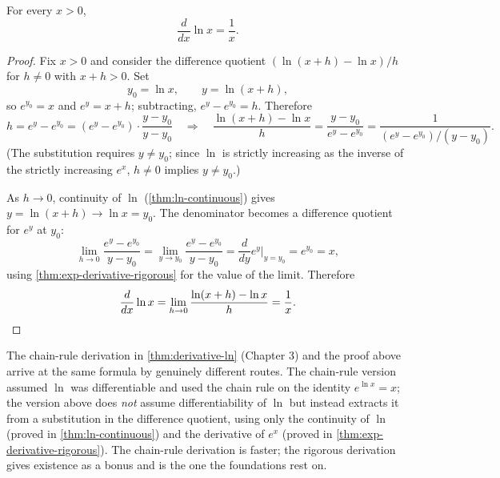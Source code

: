 \begin{theorem}\label{thm:ln-derivative-rigorous}
For every \(x > 0\),
\[
\frac{d}{dx} \ln x = \frac{1}{x}.
\]
\end{theorem}

\begin{proof}
Fix \(x > 0\) and consider the difference quotient \((\ln(x + h) - \ln x)/h\) for \(h \neq 0\) with \(x + h > 0\). Set
\[
y_{0} = \ln x, \qquad y = \ln(x + h),
\]
so \(e^{y_{0}} = x\) and \(e^{y} = x + h\); subtracting, \(e^{y} - e^{y_{0}} = h\). Therefore
\[
h = e^{y} - e^{y_{0}} = (e^{y} - e^{y_{0}}) \cdot \frac{y - y_{0}}{y - y_{0}}
\quad \Longrightarrow \quad
\frac{\ln(x + h) - \ln x}{h} = \frac{y - y_{0}}{e^{y} - e^{y_{0}}} = \frac{1}{(e^{y} - e^{y_{0}})/(y - y_{0})}.
\]
(The substitution requires \(y \neq y_{0}\); since \(\ln\) is strictly increasing as the inverse of the strictly increasing \(e^{x}\), \(h \neq 0\) implies \(y \neq y_{0}\).)

As \(h \to 0\), continuity of \(\ln\) (\cref{thm:ln-continuous}) gives \(y = \ln(x + h) \to \ln x = y_{0}\). The denominator becomes a difference quotient for \(e^{y}\) at \(y_{0}\):
\[
\lim_{h \to 0} \frac{e^{y} - e^{y_{0}}}{y - y_{0}} = \lim_{y \to y_{0}} \frac{e^{y} - e^{y_{0}}}{y - y_{0}} = \frac{d}{dy} e^{y} \bigg|_{y = y_{0}} = e^{y_{0}} = x,
\]
using \cref{thm:exp-derivative-rigorous} for the value of the limit. Therefore
\[
\frac{d}{dx} \ln x = \lim_{h \to 0} \frac{\ln(x + h) - \ln x}{h} = \frac{1}{x}. \qedhere
\]
\end{proof}

\begin{remark}
The chain-rule derivation in \cref{thm:derivative-ln} (Chapter 3) and the proof above arrive at the same formula by genuinely different routes. The chain-rule version assumed \(\ln\) was differentiable and used the chain rule on the identity \(e^{\ln x} = x\); the version above does \emph{not} assume differentiability of \(\ln\) but instead extracts it from a substitution in the difference quotient, using only the continuity of \(\ln\) (proved in \cref{thm:ln-continuous}) and the derivative of \(e^{x}\) (proved in \cref{thm:exp-derivative-rigorous}). The chain-rule derivation is faster; the rigorous derivation gives existence as a bonus and is the one the foundations rest on.
\end{remark}

